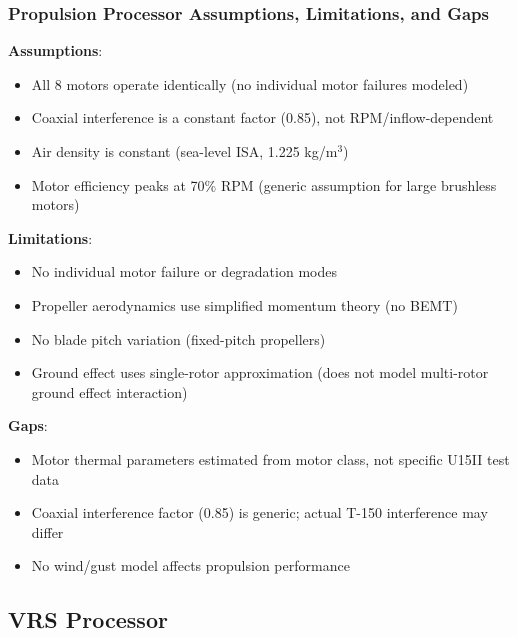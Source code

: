 \subsubsection{\unclass Propulsion Processor Assumptions, Limitations, and Gaps}\label{sec:PropulsionALG}

\unclass \textbf{Assumptions}:
\begin{itemize}
	\item \unclass All 8 motors operate identically (no individual motor failures modeled)
	\item \unclass Coaxial interference is a constant factor (0.85), not RPM/inflow-dependent
	\item \unclass Air density is constant (sea-level ISA, 1.225 kg/m$^3$)
	\item \unclass Motor efficiency peaks at 70\% RPM (generic assumption for large brushless motors)
\end{itemize}

\unclass \textbf{Limitations}:
\begin{itemize}
	\item \unclass No individual motor failure or degradation modes
	\item \unclass Propeller aerodynamics use simplified momentum theory (no BEMT)
	\item \unclass No blade pitch variation (fixed-pitch propellers)
	\item \unclass Ground effect uses single-rotor approximation (does not model multi-rotor ground effect interaction)
\end{itemize}

\unclass \textbf{Gaps}:
\begin{itemize}
	\item \unclass Motor thermal parameters estimated from motor class, not specific U15II test data
	\item \unclass Coaxial interference factor (0.85) is generic; actual T-150 interference may differ
	\item \unclass No wind/gust model affects propulsion performance
\end{itemize}

\pagebreak


\subsection{\unclass VRS Processor}\label{sec:VRSProcessor}

